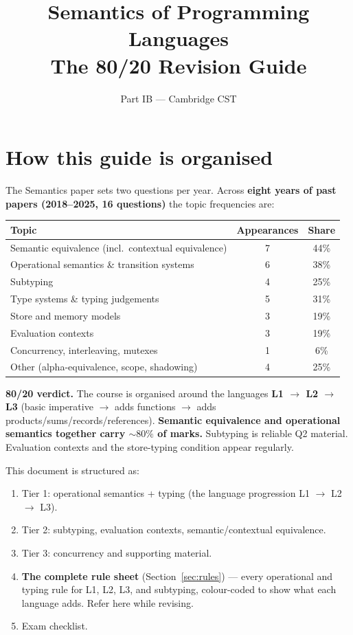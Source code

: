 \documentclass[11pt,a4paper]{article}
\title{\vspace{-1.5cm}\textbf{Semantics of Programming Languages} \\[2pt] \large The 80/20 Revision Guide}
\author{\small Part IB --- Cambridge CST}
\date{}
\begin{document}
\maketitle
\vspace{-0.8cm}

\section*{How this guide is organised}

The Semantics paper sets two questions per year. Across \textbf{eight years of past papers (2018--2025, 16 questions)} the topic frequencies are:

\begin{center}
\begin{tabular}{lcc}
\hline
\textbf{Topic} & \textbf{Appearances} & \textbf{Share} \\
\hline
Semantic equivalence (incl.\ contextual equivalence)  & 7 & 44\% \\
Operational semantics \& transition systems          & 6 & 38\% \\
Subtyping                                            & 4 & 25\% \\
Type systems \& typing judgements                    & 5 & 31\% \\
Store and memory models                              & 3 & 19\% \\
Evaluation contexts                                  & 3 & 19\% \\
Concurrency, interleaving, mutexes                   & 1 &  6\% \\
Other (alpha-equivalence, scope, shadowing)          & 4 & 25\% \\
\hline
\end{tabular}
\end{center}

\textbf{80/20 verdict.} The course is organised around the languages \textbf{L1 $\to$ L2 $\to$ L3} (basic imperative $\to$ adds functions $\to$ adds products/sums/records/references). \textbf{Semantic equivalence and operational semantics together carry ${\sim}80\%$ of marks.} Subtyping is reliable Q2 material. Evaluation contexts and the store-typing condition appear regularly.

This document is structured as:
\begin{enumerate}[leftmargin=*,itemsep=1pt]
  \item Tier 1: operational semantics + typing (the language progression L1 $\to$ L2 $\to$ L3).
  \item Tier 2: subtyping, evaluation contexts, semantic/contextual equivalence.
  \item Tier 3: concurrency and supporting material.
  \item \textbf{The complete rule sheet} (Section~\ref{sec:rules}) --- every operational and typing rule for L1, L2, L3, and subtyping, colour-coded to show what each language adds. Refer here while revising.
  \item Exam checklist.
\end{enumerate}
\end{document}
